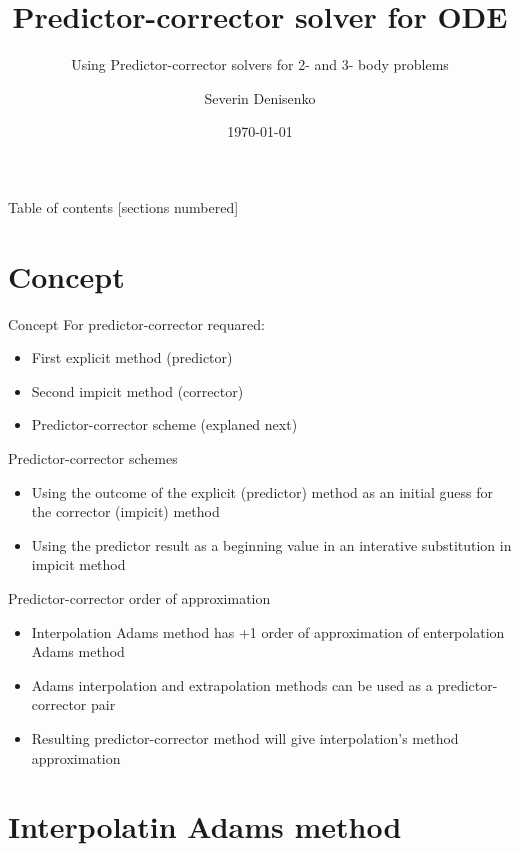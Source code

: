 \documentclass[10pt]{beamer}
\title{Predictor-corrector solver for ODE}
\subtitle{Using Predictor-corrector solvers for 2- and 3- body problems}
\date{\today}
\author{Severin Denisenko}
\institute{Saint Petersburg State University}
\begin{document}
\maketitle

\begin{frame}{Table of contents}
  [sections numbered]
  \tableofcontents%
\end{frame}

\section[Concept]{Concept}

\begin{frame}{Concept}
    For predictor-corrector requared:
	\begin{itemize}
		\item First explicit method (predictor)
		\item Second impicit method (corrector)
		\item Predictor-corrector scheme (explaned next)
	\end{itemize}
\end{frame}

\begin{frame}{Predictor-corrector schemes}
    \begin{itemize}
        \item Using the outcome of the explicit (predictor) method as an initial guess for the corrector (impicit) method
        \item Using the predictor result as a beginning value in an interative substitution in impicit method
    \end{itemize}
\end{frame}

\begin{frame}{Predictor-corrector order of approximation}
    \begin{itemize}
        \item Interpolation Adams method has +1 order of approximation of enterpolation Adams method
        \item Adams interpolation and extrapolation methods can be used as a predictor-corrector pair
        \item Resulting predictor-corrector method will give interpolation's method approximation
    \end{itemize}
\end{frame}

\section{Interpolatin Adams method}
\end{document}
